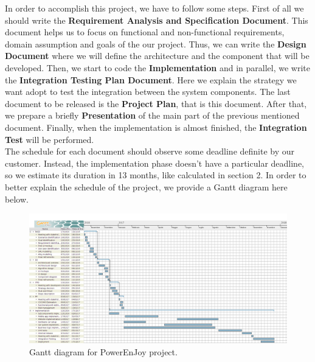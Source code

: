 In order to accomplish this project, we have to follow some steps.
First of all we should write the \textbf{Requirement Analysis and Specification Document}. This document helps us to focus on functional and non-functional requirements, domain assumption and goals of the our project.
Thus, we can write the \textbf{Design Document} where we will define the architecture and the component that will be developed.
Then, we start to code the \textbf{Implementation} and in parallel, we write the \textbf{Integration Testing Plan Document}.
Here we explain the strategy we want adopt to test the integration between the system components.
The last document to be released is the \textbf{Project Plan}, that is this document.
After that, we prepare a briefly \textbf{Presentation} of the main part of the previous mentioned document. Finally, when the implementation is almost finished, the \textbf{Integration Test} will be performed.\\
The schedule for each document should observe some deadline definite by our customer. Instead, the implementation phase doesn't have a particular deadline, so we estimate its duration in 13 months, like calculated in section 2. In order to better explain the schedule of the project, we provide a Gantt diagram here below.


\begin{figure}[hp]
  \centering
  \includegraphics[width=500 pt]{resources/gantt.png}
  \caption{\label{fig:schedule} Gantt diagram for PowerEnJoy project.}
\end{figure}
